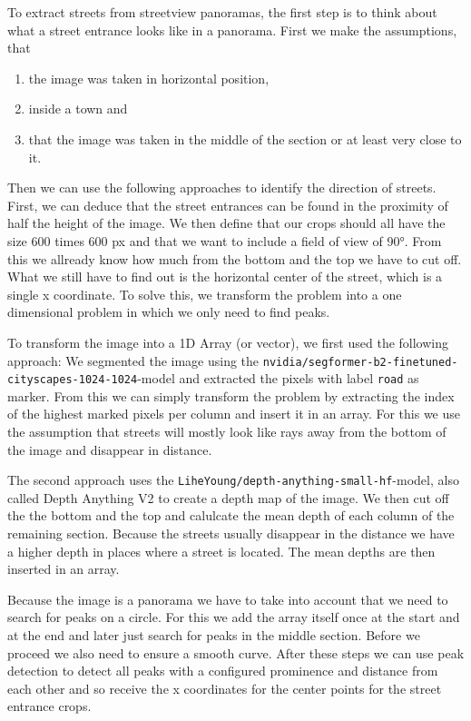 To extract streets from streetview panoramas, the first step is to think about
what a street entrance looks like in a panorama.
First  we make the assumptions, that
\begin{enumerate}
    \item the image was taken in horizontal position,
    \item inside a town and
    \item that the image was taken in the middle of the section or at least very
    close to it.
\end{enumerate}
Then we can use the following approaches to identify the direction of streets.
First, we can deduce that the street entrances can be found in the proximity of
half the height of the image. We then define that our crops should all have the
size 600 times 600 px and that we want to include a field of view of 90°.
From this we allready know how much from the bottom and the top we have to cut off.
What we still have to find out is the horizontal center of the street, which is a single x coordinate.
To solve this, we transform the problem into a one dimensional problem in which
we only need to find peaks.

To transform the image into a 1D Array (or vector), we first used the following
approach: We segmented the image using the
\texttt{nvidia/segformer-b2-finetuned-cityscapes-1024-1024}-model and extracted
the pixels with label \texttt{road} as marker.
From this we can simply transform the problem by extracting the index of the
highest marked pixels per column and insert it in an array.
For this we use the assumption that streets will mostly look like rays away
from the bottom of the image and disappear in distance.

The second approach uses the \texttt{LiheYoung/depth-anything-small-hf}-model,
also called Depth Anything V2 to create a depth map of the image.
We then cut off the the bottom and the top and calulcate the mean depth of each
column of the remaining section.
Because the streets usually disappear in the distance we have a higher depth in
places where a street is located. The mean depths are then inserted in an array.

Because the image is a panorama we have to take into account
that we need to search for peaks on a circle.
For this we add the array itself once at the start and at the end and later just
search for peaks in the middle section. Before we proceed we also need to ensure
a smooth curve. After these steps we can use peak detection to detect all peaks
with a configured prominence and distance from each other and so receive the x
coordinates for the center points for the street entrance crops.

